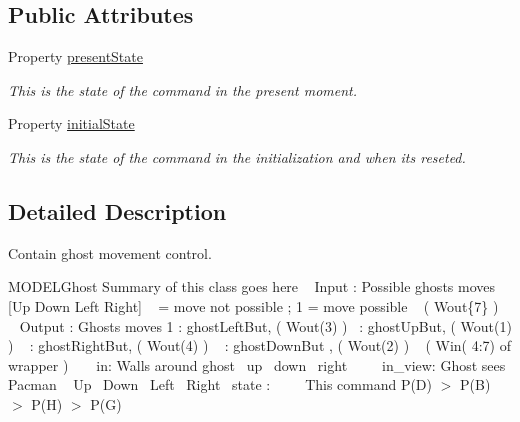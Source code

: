 \subsection*{Public Attributes}
\begin{DoxyCompactItemize}
\item 
Property \hyperlink{class_model_ghost_a9624cc7c421a50fa5086b0ebd0cd5fe3}{present\+State}
\begin{DoxyCompactList}\small\item\em This is the state of the command in the present moment. \end{DoxyCompactList}\item 
Property \hyperlink{class_model_ghost_acd9263acfa96c9138afdf497e55acc24}{initial\+State}
\begin{DoxyCompactList}\small\item\em This is the state of the command in the initialization and when it\textquotesingle{}s reseted. \end{DoxyCompactList}\end{DoxyCompactItemize}


\subsection{Detailed Description}
Contain ghost movement control. 

M\+O\+D\+E\+L\+Ghost Summary of this class goes here ~\newline
 Input \+: Possible ghost\textquotesingle{}s moves \mbox{[}Up Down Left Right\mbox{]} ~ = move not possible ; 1 = move possible ~\newline
 ( Wout\{7\} ) ~\newline
~\newline
 Output \+: Ghost\textquotesingle{}s moves 1 \+: ghost\+Left\+But, ( Wout(3) )~ \+: ghost\+Up\+But, ( Wout(1) ) ~ \+: ghost\+Right\+But, ( Wout(4) ) ~ \+: ghost\+Down\+But , ( Wout(2) ) ~\newline
 ( Win( 4\+:7) of wrapper ) ~\newline
~\newline
 in\+: Walls around ghost~ up~ down~ right~\newline
~\newline
~\newline
 in\+\_\+view\+: Ghost sees Pacman ~ Up~ Down~ Left~ Right~\newline
 state \+:~\newline
~\newline
~\newline
 This command P(\+D) $>$ P(\+B) $>$ P(\+H) $>$ P(\+G)~\newline
 

